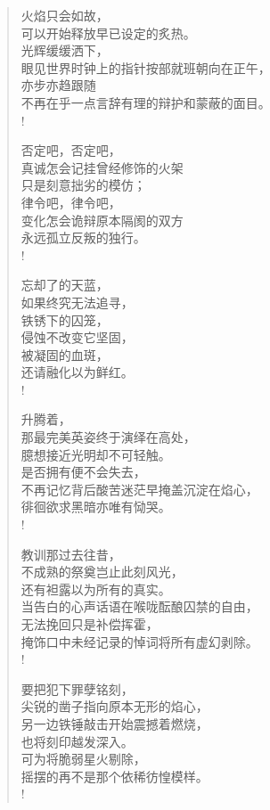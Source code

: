 \documentclass[UTF8, 12pt, a4paper]{ctexrep} %
\begin{document}
\begin{verse}
    火焰只会如故，\\
    可以开始释放早已设定的炙热。\\
    光辉缓缓洒下，\\
    眼见世界时钟上的指针按部就班朝向在正午，\\
    亦步亦趋跟随\\
    不再在乎一点言辞有理的辩护和蒙蔽的面目。\\!

    否定吧，否定吧，\\
    真诚怎会记挂曾经修饰的火架\\
    只是刻意拙劣的模仿；\\
    律令吧，律令吧，\\
    变化怎会诡辩原本隔阂的双方\\
    永远孤立反叛的独行。\\!

    忘却了的天蓝，\\
    如果终究无法追寻，\\
    铁锈下的囚笼，\\
    侵蚀不改变它坚固，\\
    被凝固的血斑，\\
    还请融化以为鲜红。\\!

    升腾着，\\
    那最完美英姿终于演绎在高处，\\
    臆想接近光明却不可轻触。\\
    是否拥有便不会失去，\\
    不再记忆背后酸苦迷茫早掩盖沉淀在焰心，\\
    徘徊欲求黑暗亦唯有恸哭。\\!

    教训那过去往昔，\\
    不成熟的祭奠岂止此刻风光，\\
    还有袒露以为所有的真实。\\
    当告白的心声话语在喉咙酝酿囚禁的自由，\\
    无法挽回只是补偿挥霍，\\
    掩饰口中未经记录的悼词将所有虚幻剥除。\\!

    要把犯下罪孽铭刻，\\
    尖锐的凿子指向原本无形的焰心，\\
    另一边铁锤敲击开始震撼着燃烧，\\
    也将刻印越发深入。\\
    可为将脆弱星火剔除，\\
    摇摆的再不是那个依稀彷惶模样。\\!


\end{verse}
\end{document}
